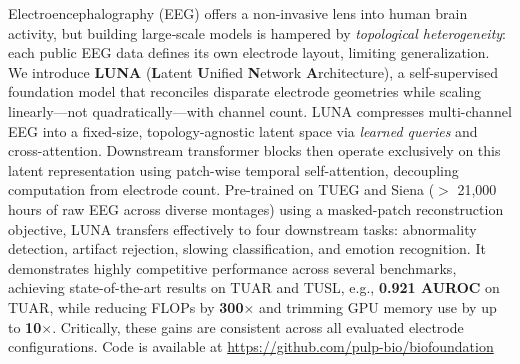 Electroencephalography (EEG) offers a non-invasive lens into human brain activity, but building large‐scale models is hampered by \emph{topological heterogeneity}: each public EEG data defines its own electrode layout, limiting generalization. We introduce \textbf{LUNA} (\textbf{L}atent \textbf{U}nified \textbf{N}etwork \textbf{A}rchitecture), a self-supervised foundation model that reconciles disparate electrode geometries while scaling linearly---not quadratically---with channel count. LUNA compresses multi-channel EEG into a fixed-size, topology-agnostic latent space via \emph{learned queries} and cross-attention. Downstream transformer blocks then operate exclusively on this latent representation using patch-wise temporal self-attention, decoupling computation from electrode count. Pre-trained on TUEG and Siena ($>$ 21,000 hours of raw EEG across diverse montages) using a masked-patch reconstruction objective, LUNA transfers effectively to four downstream tasks: abnormality detection, artifact rejection, slowing classification, and emotion recognition. It demonstrates highly competitive performance across several benchmarks, achieving state-of-the-art results on TUAR and TUSL, e.g., \textbf{0.921 AUROC} on TUAR, while reducing FLOPs by \textbf{300$\times$} and trimming GPU memory use by up to \textbf{10$\times$}. Critically,  these gains are consistent across all evaluated electrode configurations. Code is available at \url{https://github.com/pulp-bio/biofoundation}